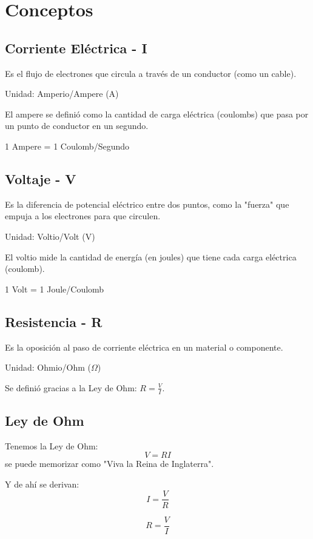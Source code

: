 \section{Conceptos}

\subsection{Corriente Eléctrica - I}
Es el flujo de electrones que circula a través de un conductor (como un cable).

Unidad: Amperio/Ampere (A)

El ampere se definió como la cantidad de carga eléctrica (coulombs) que pasa por un punto de conductor en un segundo.

1 Ampere = 1 Coulomb/Segundo

\subsection{Voltaje - V}
Es la diferencia de potencial eléctrico entre dos puntos, como la "fuerza" que empuja a los electrones para que circulen.

Unidad: Voltio/Volt (V)

El voltio mide la cantidad de energía (en joules) que tiene cada carga eléctrica (coulomb).

1 Volt = 1 Joule/Coulomb

\subsection{Resistencia - R}
Es la oposición al paso de corriente eléctrica en un material o componente.

Unidad: Ohmio/Ohm ($\Omega$)

Se definió gracias a la Ley de Ohm: $R = \frac{V}{I}$.

\subsection{Ley de Ohm}
Tenemos la Ley de Ohm:
\begin{equation}
    V = RI
\end{equation}
se puede memorizar como "Viva la Reina de Inglaterra".

Y de ahí se derivan:
\begin{equation}
    I = \frac{V}{R}
\end{equation}

\begin{equation}
    R = \frac{V}{I}
\end{equation}

